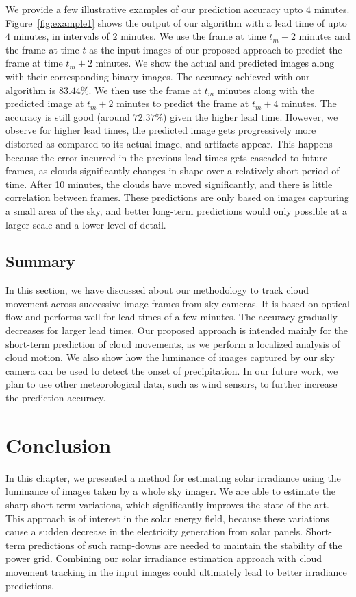 We provide a few illustrative examples of our prediction accuracy upto $4$ minutes. Figure~\ref{fig:example1} shows the output of our algorithm with a lead time of upto $4$ minutes, in intervals of $2$ minutes. We use the frame at time $t_m-2$ minutes and the frame at time $t$ as the input images of our proposed approach to predict the frame at time $t_m+2$ minutes. We show the actual and predicted images along with their corresponding binary images. The accuracy achieved with our algorithm is $83.44\%$. We then use the frame at $t_m$ minutes along with the predicted image at $t_m+2$ minutes to predict the frame at $t_m+4$ minutes. The accuracy is still good (around $72.37\%$) given the higher lead time. However, we observe for higher lead times, the predicted image gets progressively more distorted as compared to its actual image, and artifacts appear. This happens because the error incurred in the previous lead times gets cascaded to future frames, as clouds significantly changes in shape over a relatively short period of time. After 10 minutes, the clouds have moved significantly, and there is little correlation between frames. These predictions are only based on images capturing a small area of the sky, and better long-term predictions would only possible at a larger scale and a lower level of detail.

\subsection{Summary}
In this section, we have discussed about our methodology to track cloud movement across successive image frames from sky cameras. It is based on optical flow and performs well for lead times of a few minutes. The accuracy gradually decreases for larger lead times. Our proposed approach is intended mainly for the short-term prediction of cloud movements, as we perform a localized analysis of cloud motion. We also show how the luminance of images captured by our sky camera can be used to detect the onset of precipitation. In our future work, we plan to use other meteorological data, such as wind sensors, to further increase the prediction accuracy.


\section{Conclusion}
\label{sec:chap7-conclude}
In this chapter, we presented a method for estimating solar irradiance using the luminance of images taken by a whole sky imager. We are able to estimate the sharp short-term variations, which significantly improves the state-of-the-art. This approach is of interest in the solar energy field, because these variations cause a sudden decrease in the electricity generation from solar panels. Short-term predictions of such ramp-downs are needed to maintain the stability of the power grid. Combining our solar irradiance estimation approach with cloud movement tracking in the input images could ultimately lead to better irradiance predictions.










